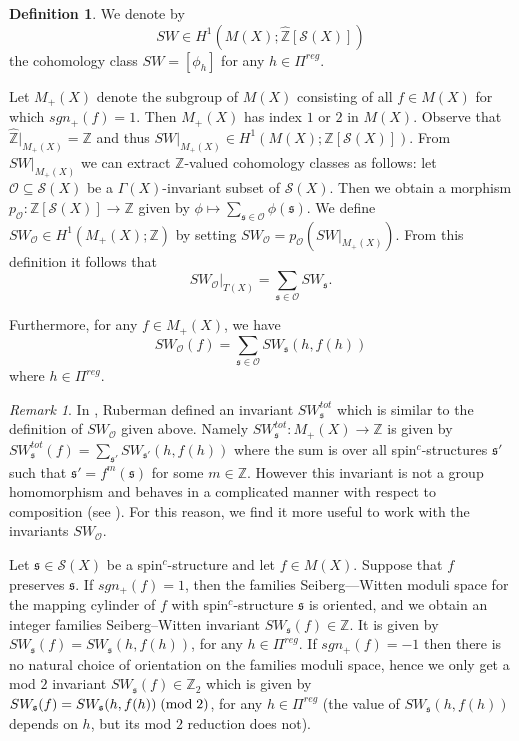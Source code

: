 \documentclass{amsart}
\theoremstyle{definition}
\newtheorem{definition}[theorem]{Definition}
\theoremstyle{remark}
\newtheorem{remark}[theorem]{Remark}
\numberwithin{equation}{section}
\begin{document}
\begin{definition}
We denote by
\[
SW \in H^1( M(X) ; \widehat{\mathbb{Z}}[\mathcal{S}(X)] )
\]
the cohomology class $SW = [\phi_h]$ for any $h \in \Pi^{reg}$.
\end{definition}

Let $M_+(X)$ denote the subgroup of $M(X)$ consisting of all $f \in M(X)$ for which $sgn_+(f) = 1$. Then $M_+(X)$ has index $1$ or $2$ in $M(X)$. Observe that $\widehat{\mathbb{Z}}|_{M_+(X)} = \mathbb{Z}$ and thus $SW|_{M_+(X)} \in H^1( M(X) ; \mathbb{Z}[\mathcal{S}(X)])$. From $SW|_{M_+(X)}$ we can extract $\mathbb{Z}$-valued cohomology classes as follows: let $\mathcal{O} \subseteq \mathcal{S}(X)$ be a $\Gamma(X)$-invariant subset of $\mathcal{S}(X)$. Then we obtain a morphism $p_{\mathcal{O}} : \mathbb{Z}[\mathcal{S}(X)] \to \mathbb{Z}$ given by $\phi \mapsto \sum_{\mathfrak{s} \in \mathcal{O}} \phi(\mathfrak{s})$. We define $SW_{\mathcal{O}} \in H^1( M_+(X) ; \mathbb{Z})$ by setting $SW_{\mathcal{O}} = p_{\mathcal{O}}( SW|_{M_+(X)} )$. From this definition it follows that
\[
SW_{\mathcal{O}}|_{T(X)} = \sum_{\mathfrak{s} \in \mathcal{O}} SW_{\mathfrak{s}}.
\]

Furthermore, for any $f \in M_+(X)$, we have
\[
SW_{\mathcal{O}}(f) = \sum_{\mathfrak{s} \in \mathcal{O}} SW_{\mathfrak{s}}(h , f(h))
\]
where $h \in \Pi^{reg}$.

\begin{remark}
In \cite{rub2}, Ruberman defined an invariant $SW_{\mathfrak{s}}^{tot}$ which is similar to the definition of $SW_{\mathcal{O}}$ given above. Namely $SW_{\mathfrak{s}}^{tot} : M_+(X) \to \mathbb{Z}$ is given by $SW_{\mathfrak{s}}^{tot}(f) = \sum_{ \mathfrak{s}' } SW_{\mathfrak{s}'}( h , f(h) )$ where the sum is over all spin$^c$-structures $\mathfrak{s}'$ such that $\mathfrak{s}' = f^m(\mathfrak{s})$ for some $m \in \mathbb{Z}$. However this invariant is not a group homomorphism and behaves in a complicated manner with respect to composition (see \cite[Theorem 3.4]{rub2}). For this reason, we find it more useful to work with the invariants $SW_{\mathcal{O}}$.
\end{remark}


Let $\mathfrak{s} \in \mathcal{S}(X)$ be a spin$^c$-structure and let $f \in M(X)$. Suppose that $f$ preserves $\mathfrak{s}$. If $sgn_+(f) = 1$, then the families Seiberg---Witten moduli space for the mapping cylinder of $f$ with spin$^c$-structure $\mathfrak{s}$ is oriented, and we obtain an integer families Seiberg--Witten invariant $SW_{\mathfrak{s}}(f) \in \mathbb{Z}$. It is given by $SW_{\mathfrak{s}}(f) = SW_{\mathfrak{s}}( h , f(h) )$, for any $h \in \Pi^{reg}$. If $sgn_+(f) = -1$ then there is no natural choice of orientation on the families moduli space, hence we only get a mod $2$ invariant $SW_{\mathfrak{s}}(f) \in \mathbb{Z}_2$ which is given by $SW_{\mathfrak{s}}(f) = SW_{\mathfrak{s}}(h , f(h)) \; ({\rm mod} \; 2)$, for any $h \in \Pi^{reg}$ (the value of $SW_{\mathfrak{s}}(h,f(h))$ depends on $h$, but its mod $2$ reduction does not).
\end{document}
